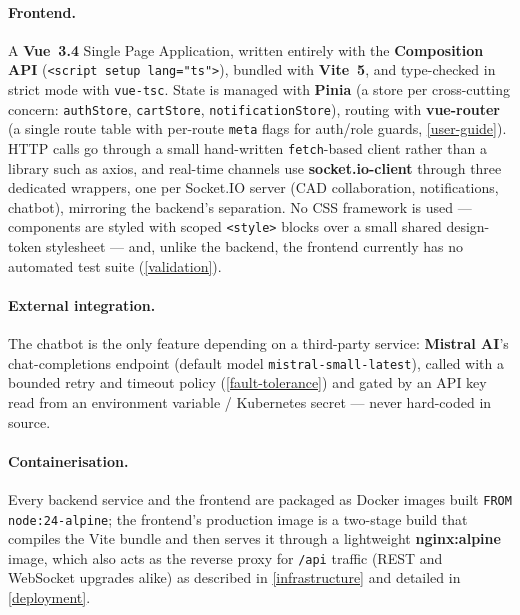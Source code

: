 \paragraph{Frontend.} A \textbf{Vue~3.4} Single Page Application, written
entirely with the \textbf{Composition API} (\texttt{<script setup lang="ts">}),
bundled with \textbf{Vite~5}, and type-checked in strict mode with
\texttt{vue-tsc}. State is managed with \textbf{Pinia} (a store per
cross-cutting concern: \texttt{authStore}, \texttt{cartStore},
\texttt{notificationStore}), routing with \textbf{vue-router} (a single
route table with per-route \texttt{meta} flags for auth/role guards,
\cref{user-guide}). HTTP calls go through a small hand-written
\texttt{fetch}-based client rather than a library such as axios, and
real-time channels use \textbf{socket.io-client} through three dedicated
wrappers, one per Socket.IO server (CAD collaboration, notifications,
chatbot), mirroring the backend's separation. No CSS framework is used ---
components are styled with scoped \texttt{<style>} blocks over a small shared
design-token stylesheet --- and, unlike the backend, the frontend currently
has no automated test suite (\cref{validation}).

\paragraph{External integration.} The chatbot is the only feature depending
on a third-party service: \textbf{Mistral AI}'s chat-completions endpoint
(default model \texttt{mistral-small-latest}), called with a bounded retry
and timeout policy (\cref{fault-tolerance}) and gated by an API key read from
an environment variable / Kubernetes secret --- never hard-coded in source.

\paragraph{Containerisation.} Every backend service and the frontend are
packaged as Docker images built \texttt{FROM node:24-alpine}; the frontend's
production image is a two-stage build that compiles the Vite bundle and then
serves it through a lightweight \textbf{nginx:alpine} image, which also acts
as the reverse proxy for \texttt{/api} traffic (REST and WebSocket upgrades
alike) as described in \cref{infrastructure} and detailed in
\cref{deployment}.
